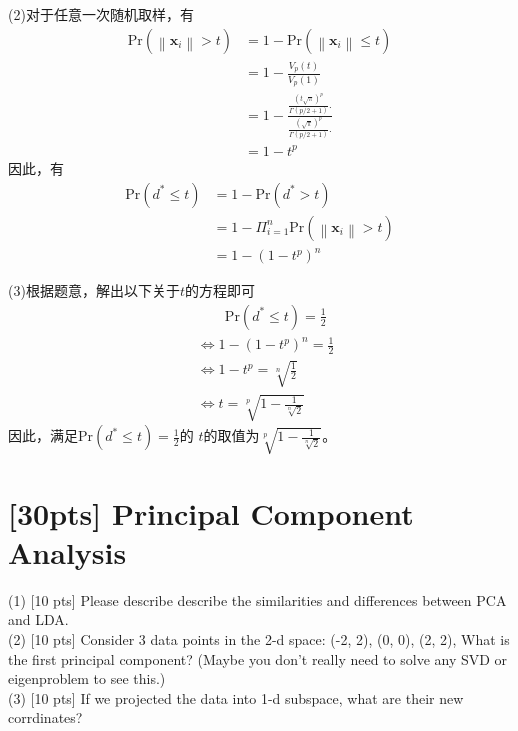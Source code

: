 \documentclass[a4paper,utf8]{article}
\begin{document}
	\noindent
	(2)对于任意一次随机取样，有
	\begin{equation}
		\begin{split}
			\text{Pr}(\left\|\mathbf{x}_{i}\right\|>t)
			& =1-\text{Pr}(\left\|\mathbf{x}_{i}\right\|\leq t)\\
			& =1-\frac{V_{p}(t)}{V_{p}(1)}\\
			& =1-\frac{\frac{(t\sqrt{\pi})^{p}}{\Gamma(p/2+1)}.}
									 {\frac{(\sqrt{\pi})^{p}}{\Gamma(p/2+1)}.}\\
			& =1-t^p
		\end{split}
	\end{equation}
	因此，有
	\begin{equation}
		\begin{split}
			\text{Pr}(d^*\leq t)
			& =1-\text{Pr}(d^*>t) \\
			& =1-\Pi_{i=1}^n\text{Pr}(\left\|\mathbf{x}_{i}\right\|>t) \\
			& =1-(1-t^p)^n
		\end{split}
	\end{equation}

	\noindent
	(3)根据题意，解出以下关于$t$的方程即可
	\begin{equation}
		\begin{split}
			& \quad\quad \text{Pr}(d^*\leq t)=\frac{1}{2}\\
			& \Leftrightarrow 1-(1-t^p)^n=\frac{1}{2}\\
			& \Leftrightarrow 1-t^p=\sqrt[n]{\frac{1}{2}}\\
			& \Leftrightarrow t=\sqrt[p]{1-\frac{1}{\sqrt[n]{2}}}
		\end{split}
	\end{equation}
	因此，满足Pr$(d^*\leq t)=\frac{1}{2}$的
	$t$的取值为$\sqrt[p]{1-\frac{1}{\sqrt[n]{2}}}$。




	
	\newpage
	\section{[30pts] Principal Component Analysis }
	\noindent
	(1) [10 pts] Please describe describe the similarities and differences between PCA and LDA.\\
	(2) [10 pts] Consider 3 data points in the 2-d space: (-2, 2), (0, 0), (2, 2), What is the first principal component? (Maybe you don't really need to solve any SVD or eigenproblem to see this.)\\
	(3) [10 pts] If we projected the data into 1-d subspace, what are their new corrdinates?
\end{document}
